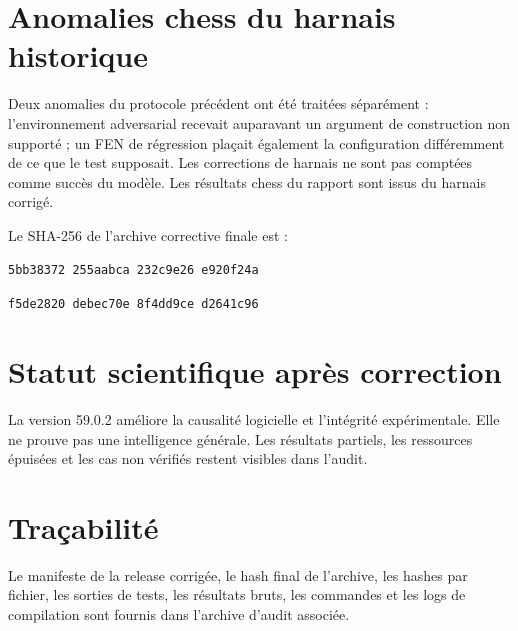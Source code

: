 \documentclass[11pt,a4paper]{article}
\begin{document}
\section{Anomalies chess du harnais historique}
Deux anomalies du protocole précédent ont été traitées séparément : l'environnement adversarial recevait auparavant un argument de construction non supporté ; un FEN de régression plaçait également la configuration différemment de ce que le test supposait. Les corrections de harnais ne sont pas comptées comme succès du modèle. Les résultats chess du rapport sont issus du harnais corrigé.

Le SHA-256 de l'archive corrective finale est :
\begin{center}\texttt{5bb38372 255aabca 232c9e26 e920f24a}\par\texttt{f5de2820 debec70e 8f4dd9ce d2641c96}\end{center}

\section{Statut scientifique après correction}
La version 59.0.2 améliore la causalité logicielle et l'intégrité expérimentale. Elle ne prouve pas une intelligence générale. Les résultats partiels, les ressources épuisées et les cas non vérifiés restent visibles dans l'audit.

\section{Traçabilité}
Le manifeste de la release corrigée, le hash final de l'archive, les hashes par fichier, les sorties de tests, les résultats bruts, les commandes et les logs de compilation sont fournis dans l'archive d'audit associée.
\end{document}
